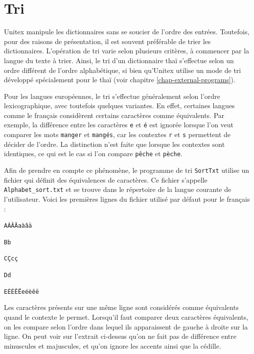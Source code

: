 \section{Tri}

Unitex manipule les dictionnaires sans se soucier de l’ordre des entrées. Toutefois, pour
des raisons de présentation, il est souvent préférable de trier les dictionnaires. L’opération
de tri varie selon plusieurs critères, à commencer par la langue du texte à trier. Ainsi, le
tri d’un dictionnaire thaï s’effectue selon un ordre différent de l’ordre alphabétique, si bien
qu’Unitex utilise un mode de tri développé spécialement pour le thaï (voir chapitre
 \ref{chap-external-programs}).

\bigskip
\noindent Pour les langues européennes, le tri s’effectue généralement selon l’ordre
lexicographique, avec toutefois quelques variantes. En effet, certaines langues comme le français
considèrent certains caractères comme équivalents. Par exemple, la différence entre les caractères
\verb+e+ et \texttt{é} est ignorée lorsque l’on veut comparer les mots \verb+manger+ et
\texttt{mangés}, car les contextes \verb+r+ et \verb+s+ permettent de décider de l’ordre. La
distinction n’est faite que lorsque les contextes sont identiques, ce qui est le cas si l’on
compare \texttt{pêche} et \texttt{pèche}.

\bigskip {}
\noindent
Afin de prendre en compte ce phénomène, le programme de tri \verb+SortTxt+  
 utilise un fichier qui définit des
équivalences de caractères.   Ce fichier s’appelle
\verb+Alphabet_sort.txt+  et se trouve dans le répertoire
de la langue courante de l’utilisateur. Voici les premières lignes du fichier utilisé par défaut
pour le français :


\bigskip
\noindent
\texttt{AÀÂÄaàâä}

\noindent
\texttt{Bb}

\noindent
\texttt{CÇcç}

\noindent
\texttt{Dd}

\noindent
\texttt{EÉÈÊËeéèêë}


\bigskip
\noindent Les caractères présents sur une même ligne sont considérés comme équivalents quand
le contexte le permet. Lorsqu’il faut comparer deux caractères équivalents, on les compare
selon l’ordre dans lequel ils apparaissent de gauche à droite sur la ligne. On peut voir sur
l’extrait ci-dessus qu’on ne fait pas de différence entre minuscules et majuscules, et qu’on
ignore les accents ainsi que la cédille.


